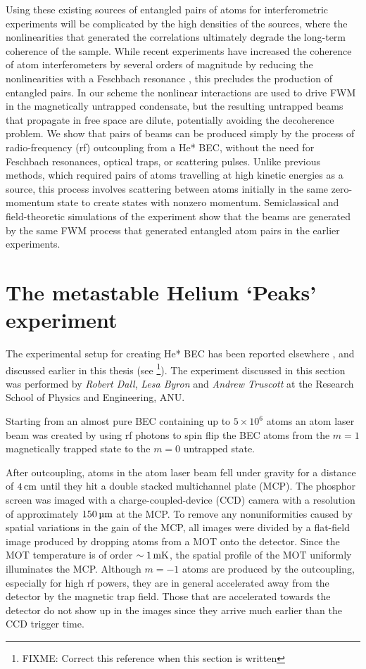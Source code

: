 Using these existing sources of entangled pairs of atoms for interferometric experiments will be complicated by the high densities of the sources, where the nonlinearities that generated the correlations ultimately degrade the long-term coherence of the sample. While recent experiments have increased the coherence of atom interferometers by several orders of magnitude by reducing the nonlinearities with a Feschbach resonance \citep{Fattori:2008,Gustavsson:2008}, this precludes the production of entangled pairs. In our scheme the nonlinear interactions are used to drive FWM in the magnetically untrapped condensate, but the resulting untrapped beams that propagate in free space are dilute, potentially avoiding the decoherence problem. We show that pairs of beams can be produced simply by the process of radio-frequency (rf) outcoupling from a He* BEC, without the need for Feschbach resonances, optical traps, or scattering pulses. Unlike previous methods, which required pairs of atoms travelling at high kinetic energies as a source, this process involves scattering between atoms initially in the same zero-momentum state to create states with nonzero momentum. Semiclassical and field-theoretic simulations of the experiment show that the beams are generated by the same FWM process that generated entangled atom pairs in the earlier experiments.

\section{The metastable Helium `Peaks' experiment}
\label{Peaks:ExperimentalSetup}

The experimental setup for creating He* BEC has been reported elsewhere \citep{Dall:2007a}, and discussed earlier in this thesis (see \footnote{FIXME: Correct this reference when this section is written}). The experiment discussed in this section was performed by \emph{Robert Dall}, \emph{Lesa Byron} and \emph{Andrew Truscott} at the Research School of Physics and Engineering, ANU.

Starting from an almost pure BEC containing up to $5\times 10^6$ atoms an atom laser beam was created by using rf photons to spin flip the BEC atoms from the $m=1$ magnetically trapped state to the $m=0$ untrapped state.

After outcoupling, atoms in the atom laser beam fell under gravity for a distance of $\unit[4]{cm}$ until they hit a double stacked multichannel plate (MCP). The phosphor screen was imaged with a charge-coupled-device (CCD) camera with a resolution of approximately $\unit[150]{\micro m}$ at the MCP. To remove any nonuniformities caused by spatial variations in the gain of the MCP, all images were divided by a flat-field image produced by dropping atoms from a MOT onto the detector. Since the MOT temperature is of order $\sim\unit[1]{mK}$, the spatial profile of the MOT uniformly illuminates the MCP. Although $m=-1$ atoms are produced by the outcoupling, especially for high rf powers, they are in general accelerated away from the detector by the magnetic trap field. Those that are accelerated towards the detector do not show up in the images since they arrive much earlier than the CCD trigger time.


